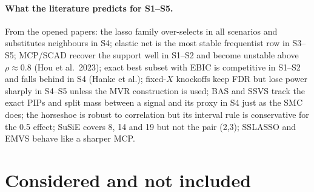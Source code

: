 \documentclass[11pt,letterpaper]{article}
\begin{document}
\paragraph{What the literature predicts for S1--S5.} From the opened papers: the lasso family over-selects in all scenarios and substitutes neighbours in S4; elastic net is the most stable frequentist row in S3--S5; MCP/SCAD recover the support well in S1--S2 and become unstable above $\rho\approx0.8$ (Hou et al.\ 2023); exact best subset with EBIC is competitive in S1--S2 and falls behind in S4 (Hanke et al.); fixed-$X$ knockoffs keep FDR but lose power sharply in S4--S5 unless the MVR construction is used; BAS and SSVS track the exact PIPs and split mass between a signal and its proxy in S4 just as the SMC does; the horseshoe is robust to correlation but its interval rule is conservative for the 0.5 effect; SuSiE covers 8, 14 and 19 but not the pair (2,3); SSLASSO and EMVS behave like a sharper MCP.

\section{Considered and not included}\label{sec:excluded}
\end{document}
